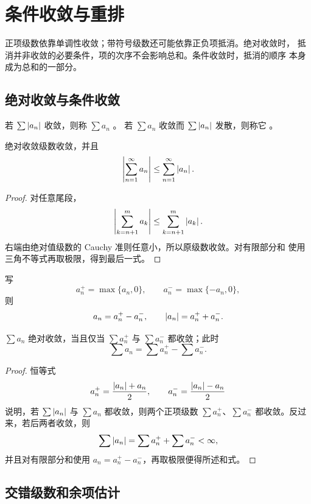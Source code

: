 \chapter{条件收敛与重排}
\label{chap:conditional-convergence-rearrangement}

正项级数依靠单调性收敛；带符号级数还可能依靠正负项抵消。绝对收敛时，
抵消并非收敛的必要条件，项的次序不会影响总和。条件收敛时，抵消的顺序
本身成为总和的一部分。

\section{绝对收敛与条件收敛}

\begin{definition}
若 \(\sum\left|a_n\right|\) 收敛，则称 \(\sum a_n\) 。
若 \(\sum a_n\) 收敛而 \(\sum\left|a_n\right|\) 发散，则称它
。
\end{definition}

\begin{theorem}[绝对收敛蕴含收敛]
\label{thm:absolute-series-converges}
绝对收敛级数收敛，并且
\[
 \left|\sum_{n=1}^\infty a_n\right|
 \le\sum_{n=1}^\infty\left|a_n\right|.
\]
\end{theorem}

\begin{proof}
对任意尾段，
\[
 \left|\sum_{k=n+1}^m a_k\right|
 \le\sum_{k=n+1}^m\left|a_k\right|.
\]
右端由绝对值级数的 Cauchy 准则任意小，所以原级数收敛。对有限部分和
使用三角不等式再取极限，得到最后一式。
\end{proof}

写
\[
 a_n^+=\max\{a_n,0\},\qquad
 a_n^-=\max\{-a_n,0\},
\]
则
\[
 a_n=a_n^+-a_n^-,
\qquad
 \left|a_n\right|=a_n^++a_n^-.
\]

\begin{proposition}
\label{prop:positive-negative-parts-series}
\(\sum a_n\) 绝对收敛，当且仅当
\(\sum a_n^+\) 与 \(\sum a_n^-\) 都收敛；此时
\[
 \sum a_n=\sum a_n^+-\sum a_n^-.
\]
\end{proposition}

\begin{proof}
恒等式
\[
 a_n^+=\frac{\left|a_n\right|+a_n}{2},\qquad
 a_n^-=\frac{\left|a_n\right|-a_n}{2}
\]
说明，若 \(\sum\left|a_n\right|\) 与 \(\sum a_n\) 都收敛，则两个正项级数
\(\sum a_n^+\)、\(\sum a_n^-\) 都收敛。反过来，若后两者收敛，则
\[
 \sum\left|a_n\right|=\sum a_n^++\sum a_n^-<\infty,
\]
并且对有限部分和使用 \(a_n=a_n^+-a_n^-\)，再取极限便得所述和式。
\end{proof}

\section{交错级数和余项估计}

